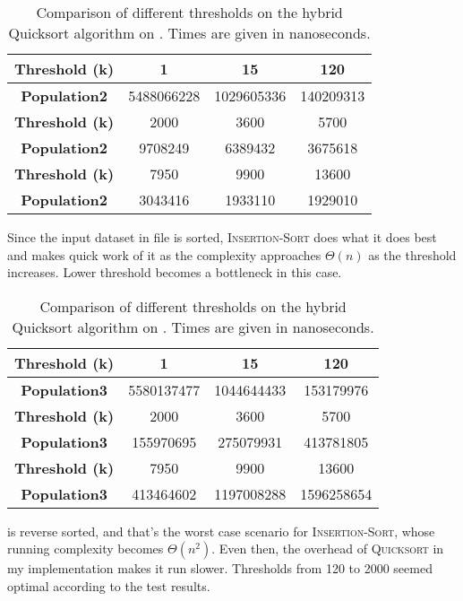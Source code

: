 \begin{table}[H]
\centering
\begin{tabular}{|c|c|c|c|}
\hline
\textbf{Threshold (k)} & 1 & 15 & 120 \\ \hline
\textbf{Population2}   & 5488066228 & 1029605336 & 140209313 \\ \hline
\hline
\textbf{Threshold (k)} & 2000 & 3600 & 5700 \\ \hline
\textbf{Population2}   & 9708249 & 6389432 & 3675618 \\ \hline
\hline
\textbf{Threshold (k)} & 7950 & 9900 & 13600 \\ \hline
\textbf{Population2}   & 3043416 & 1933110 & 1929010 \\ \hline
\end{tabular}
\caption{Comparison of different thresholds on the hybrid Quicksort algorithm on . Times are given in nanoseconds.}
\label{table:pop2}
\end{table}

Since the input dataset in file  is sorted, \textsc{Insertion-Sort} does what it does best and makes quick work of it as the complexity approaches $\Theta(n)$ as the threshold increases. Lower threshold becomes a bottleneck in this case.

\begin{table}[H]
\centering
\begin{tabular}{|c|c|c|c|}
\hline
\textbf{Threshold (k)} & 1 & 15 & 120 \\ \hline
\textbf{Population3}   & 5580137477 & 1044644433 & 153179976 \\ \hline
\hline
\textbf{Threshold (k)} & 2000 & 3600 & 5700 \\ \hline
\textbf{Population3}   & 155970695 & 275079931 & 413781805 \\ \hline
\hline
\textbf{Threshold (k)} & 7950 & 9900 & 13600 \\ \hline
\textbf{Population3}   & 413464602 & 1197008288 & 1596258654 \\ \hline
\end{tabular}
\caption{Comparison of different thresholds on the hybrid Quicksort algorithm on . Times are given in nanoseconds.}
\label{table:pop3}
\end{table}

 is reverse sorted, and that's the worst case scenario for \textsc{Insertion-Sort}, whose running complexity becomes $\Theta(n^2)$. Even then, the overhead of \textsc{Quicksort} in my implementation makes it run slower. Thresholds from 120 to 2000 seemed optimal according to the test results.

